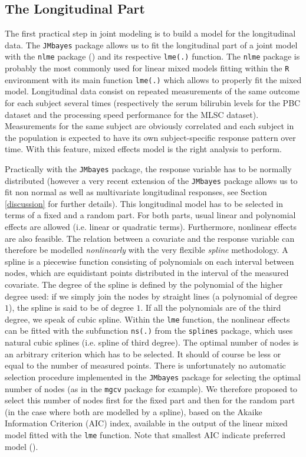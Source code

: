 \documentclass[12pt]{article}
\begin{document}
\subsection{The Longitudinal Part}
\label{Longitudinal submodel}

The first practical step in joint modeling is to build a model for the longitudinal data. The \texttt{JMbayes} package allows us to fit the longitudinal part of a joint model with the \texttt{nlme} package (\cite{nlme}) and its respective \texttt{lme(.)} function. The \texttt{nlme} package is probably the most commonly used for linear mixed models fitting within the \texttt{R} environment with its main function \texttt{lme(.)} which allows to properly fit  the mixed model. Longitudinal data consist on repeated measurements of the same outcome for each subject several times (respectively the serum bilirubin levels for the PBC dataset and the processing speed performance for the MLSC dataset). Measurements for the same subject are obviously correlated and each subject in the population is expected to have its own subject-specific response pattern over time. With this feature, mixed effects model is the right analysis to perform.

Practically with the \texttt{JMbayes} package, the response variable has to be normally distributed (however a very recent extension of the \texttt{JMbayes} package allows us to fit non normal as well as multivariate longitudinal responses, see Section \ref{discussion} for further details). This longitudinal model has to be selected in terms of a fixed and a random part. For both parts, usual linear and polynomial effects are allowed (i.e. linear or quadratic terms). Furthermore, nonlinear effects are also feasible. The relation between a covariate and the response variable can therefore be modelled \textit{nonlinearly} with the very flexible \textit{spline} methodology. A spline is a piecewise function consisting of polynomials on each interval between nodes, which are equidistant points distributed in the interval of the measured covariate. The degree of the spline is defined by the polynomial of the higher degree used: if we simply join the nodes by straight lines (a polynomial of degree $1$), the spline is said to be of degree $1$. If all the polynomials are of the third degree, we speak of cubic spline. Within the \texttt{lme} function, the nonlinear effects can be fitted with the subfunction \texttt{ns(.)} from the \texttt{splines} package, which uses natural cubic splines (i.e. spline of third degree). The optimal number of nodes is an arbitrary criterion which has to be selected. It should of course be less or equal to the number of measured points. There is unfortunately no automatic selection procedure implemented in the \texttt{JMbayes} package for selecting the optimal number of nodes (as in the \texttt{mgcv} package for example). We therefore proposed to select this number of nodes first for the fixed part and then for the random part (in the case where both are modelled by a spline), based on the Akaike Information Criterion (AIC) index, available in the output of the linear mixed model fitted with the \texttt{lme} function. Note that smallest AIC indicate preferred model (\cite{akaike_new_1974}).
\end{document}
